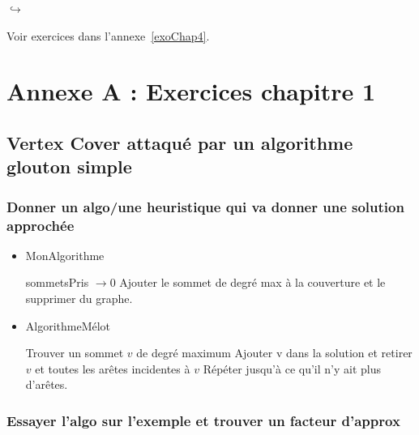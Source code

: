 \documentclass[12pt]{article}
\begin{document}
\vspace{38em}
\begin{flushright}
$\hookrightarrow$ \begin{large}Voir exercices dans l'annexe~\ref{exoChap4}.\end{large}
\end{flushright}



\appendix

\section{Annexe A : Exercices chapitre 1}\label{exochap1}

\subsection{Vertex Cover attaqué par un algorithme glouton simple}

\subsubsection*{Donner un algo/une heuristique qui va donner une solution approchée}

\begin{itemize}
\item[]
\begin{algorithm}[H]
\caption{MonAlgorithme}
\begin{algorithmic}[1]
\STATE sommetsPris $\rightarrow 0$
\STATE Ajouter le sommet de degré max à la couverture et le supprimer du graphe.
\ENDWHILE
\end{algorithmic}
\end{algorithm}
\item[]
\begin{algorithm}[H]
\caption{AlgorithmeMélot}
\begin{algorithmic}[1]
\STATE Trouver un sommet $v$ de degré maximum
\STATE Ajouter v dans la solution et retirer $v$ et toutes les arêtes incidentes à $v$
\STATE Répéter jusqu'à ce qu'il n'y ait plus d'arêtes.
\end{algorithmic}
\end{algorithm}
\end{itemize}

\subsubsection*{Essayer l'algo sur l'exemple et trouver un facteur d'approx}
\end{document}
